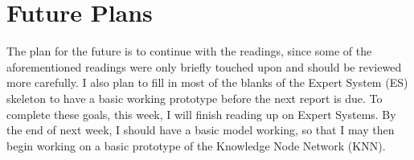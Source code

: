 \documentclass[]{article}
\begin{document}
\section{Future Plans}

The plan for the future is to continue with the readings, since some of the aforementioned readings were only briefly touched upon and should be reviewed more carefully. I also plan to fill in most of the blanks of the Expert System (ES) skeleton to have a basic working prototype before the next report is due. To complete these goals, this week, I will finish reading up on Expert Systems. By the end of next week, I should have a basic model working, so that I may then begin working on a basic prototype of the Knowledge Node Network (KNN).


{}
\end{document}
